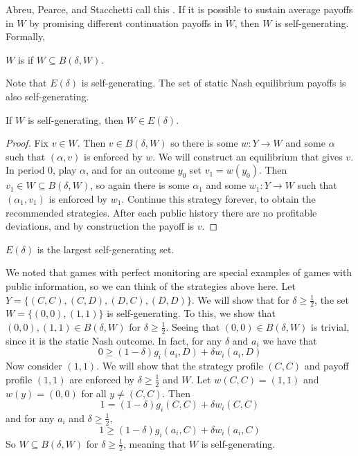 \documentclass[10pt]{article}
\begin{document}
\begin{model}
	Abreu, Pearce, and Stacchetti call this . If it is possible to sustain average payoffs in $W$ by promising different continuation payoffs in $W$, then $W$ is self-generating. Formally,
	\begin{definition}
		$W$ is  if $W \subseteq B(\delta,W)$.
	\end{definition}
	\begin{remark}
		Note that $E(\delta)$ is self-generating. The set of static Nash equilibrium payoffs is also self-generating.
	\end{remark}
	\begin{proposition}
		If $W$ is self-generating, then $W \in E(\delta)$.
	\end{proposition}
	\begin{proof}
		Fix $v \in W$. Then $v \in B(\delta,W)$ so there is some $w :Y\to W$ and some $\alpha$ such that $(\alpha,v)$ is enforced by $w$. We will construct an equilibrium that gives $v$. In period 0, play $\alpha$, and for an outcome $y_0$ set $v_1 = w(y_0)$. Then $v_1 \in W \subseteq B(\delta,W)$, so again there is some $\alpha_1$ and some $w_1: Y \to W$ such that $(\alpha_1,v_1)$ is enforced by $w_1$. Continue this strategy forever, to obtain the recommended strategies. After each public history there are no profitable deviations, and by construction the payoff is $v$.
	\end{proof}
	\begin{corollary}
		$E(\delta)$ is the largest self-generating set.
	\end{corollary}
\end{model}


\begin{example}
	 We noted that games with perfect monitoring are special examples of games with public information, so we can think of the strategies above here. Let $Y = \{(C,C),(C,D),(D,C),(D,D)\}$. We will show that for $\delta \ge \frac{1}{2}$, the set $W = \{(0,0),(1,1)\}$ is self-generating. To this, we show that $(0,0), (1,1) \in B(\delta,W)$ for $\delta \ge \frac{1}{2}$. Seeing that $(0,0) \in B(\delta,W)$ is trivial, since it is the static Nash outcome. In fact, for any $\delta$ and $a_i$ we have that\[0 \ge (1-\delta) g_i(a_i,D) + \delta w_i(a_i,D)\]Now consider $(1,1)$. We will show that the strategy profile $(C,C)$ and payoff profile $(1,1)$ are enforced by $\delta \ge \frac{1}{2}$ and $W$. Let $w(C,C) = (1,1)$ and $w(y) = (0,0)$ for all $y \ne (C,C)$. Then \[1= (1-\delta) g_i(C,C) + \delta w_i(C,C) \]and for any $a_i$ and $\delta \ge \frac{1}{2}$,\[1 \ge (1-\delta)g_i(a_i,C) + \delta w_i(a_i,C)\]So $W \subseteq B(\delta,W)$ for $\delta \ge \frac{1}{2}$, meaning that $W$ is self-generating.
	
\end{example}
\end{document}
